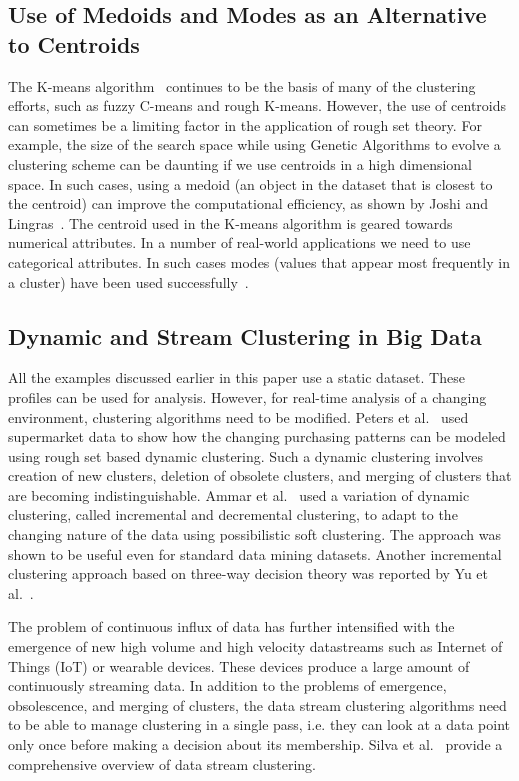 \documentclass[oribibl]{llncs}
\begin{document}
\subsection{Use of Medoids and Modes as an Alternative to Centroids}
The K-means algorithm~\cite{HartiganWong1979} continues to be the basis of many of the clustering efforts, such as fuzzy C-means and rough K-means. However, the use of centroids can sometimes be a limiting factor in the application of rough set theory. For example, the size of the search space while using Genetic Algorithms to evolve a clustering scheme can be daunting if we use centroids in a high dimensional space. In such cases, using a medoid (an object in the dataset that is closest to the centroid) can improve the computational efficiency, as shown by Joshi and Lingras~\cite{JoshiLingras2009}. The centroid used in the K-means algorithm is geared towards numerical attributes. In a number of real-world applications we need to use categorical attributes. 
In such cases modes (values that appear most frequently in a cluster) have been used successfully~\cite{Ammar2013decremental,AmmarEtAl2013incremental}.

\subsection{Dynamic and Stream Clustering in Big Data}
All the examples discussed earlier in this paper use a static dataset. These profiles can be used for analysis. However, for real-time analysis of a changing environment, clustering algorithms need to be modified. 
Peters et al.~\cite{PetersEtAl2012} used supermarket data to show how the changing purchasing patterns can be modeled using rough set based dynamic clustering. Such a dynamic clustering involves creation of new clusters, deletion of obsolete clusters, and merging of clusters that are becoming indistinguishable. Ammar et al.~\cite{Ammar2013decremental,AmmarEtAl2013incremental} used a variation of dynamic clustering, called incremental and decremental clustering, to adapt to the changing nature of the data using possibilistic soft clustering. The approach was shown to be useful even for standard data mining datasets. Another incremental clustering approach based on three-way decision theory was reported by Yu et al.~\cite{yu2016tree}.

The problem of continuous influx of data has further intensified with the emergence of new high volume and high velocity datastreams such as Internet of Things (IoT) or wearable devices. These devices produce a large amount of continuously streaming data. In addition to the problems of emergence, obsolescence, and merging of clusters, the data stream clustering algorithms need to be able to manage clustering in a single pass, i.e. they can look at a data point only once before making a decision about its membership. Silva et al.~\cite{Silva2013data} provide a comprehensive overview of data stream clustering.
\end{document}
